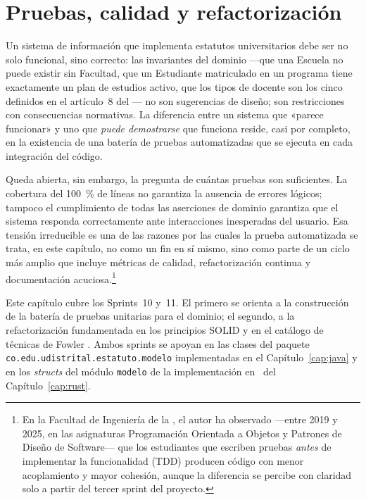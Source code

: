 
\chapter{Pruebas, calidad y refactorización}
\label{cap:pruebas}

\noindent
Un sistema de información que implementa estatutos universitarios debe ser no solo funcional,
sino correcto: las invariantes del dominio ---que una Escuela no puede existir sin Facultad,
que un Estudiante matriculado en un programa tiene exactamente un plan de estudios activo,
que los tipos de docente son los cinco definidos en el artículo~8 del \acuerdo--- no son
sugerencias de diseño; son restricciones con consecuencias normativas. La diferencia entre
un sistema que «parece funcionar» y uno que \emph{puede demostrarse} que funciona reside,
casi por completo, en la existencia de una batería de pruebas automatizadas que se ejecuta
en cada integración del código.

Queda abierta, sin embargo, la pregunta de cuántas pruebas son suficientes. La cobertura del
100~\% de líneas no garantiza la ausencia de errores lógicos; tampoco el cumplimiento de todas
las aserciones de dominio garantiza que el sistema responda correctamente ante interacciones
inesperadas del usuario. Esa tensión irreducible es una de las razones por las cuales la
prueba automatizada se trata, en este capítulo, no como un fin en sí mismo, sino como parte
de un ciclo más amplio que incluye métricas de calidad, refactorización continua y
documentación acuciosa.\footnote{En la Facultad de Ingeniería de la \ud, el autor ha
observado ---entre 2019 y 2025, en las asignaturas Programación Orientada a Objetos y
Patrones de Diseño de Software--- que los estudiantes que escriben pruebas \emph{antes}
de implementar la funcionalidad (TDD) producen código con menor acoplamiento y mayor
cohesión, aunque la diferencia se percibe con claridad solo a partir del tercer sprint
del proyecto.}

Este capítulo cubre los Sprints~10 y~11. El primero se orienta a la construcción de la
batería de pruebas unitarias para el dominio; el segundo, a la refactorización fundamentada
en los principios SOLID \parencite{Martin2017} y en el catálogo de técnicas de Fowler
\parencite{Fowler2018}. Ambos sprints se apoyan en las clases del paquete
\texttt{co.edu.udistrital.estatuto.modelo} implementadas en el Capítulo~\ref{cap:java}
y en los \textit{structs} del módulo \texttt{modelo} de la implementación en \rust\
del Capítulo~\ref{cap:rust}.


